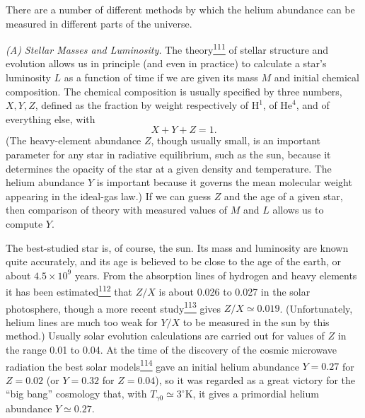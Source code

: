 There are a number of different methods by which the helium abundance can be
measured in different parts of the universe.

\emph{(A) Stellar Masses and Luminosity.} The
theory\hyperref[ch15-ref-111]{\textsuperscript{111}} of stellar structure and
evolution allows us in principle (and even in practice) to calculate a star's
luminosity \(L\) as a function of time if we are given its mass \(M\) and
initial chemical composition. The chemical composition is usually specified
by three numbers, \(X,Y,Z\), defined as the fraction by weight respectively
of \(\mathrm H^1\), of \(\mathrm{He}^4\), and of everything else, with
\[
  X+Y+Z=1.
\]
(The heavy-element abundance \(Z\), though usually small, is an important
parameter for any star in radiative equilibrium, such as the sun, because it
determines the opacity of the star at a given density and temperature. The
helium abundance \(Y\) is important because it governs the mean molecular
weight appearing in the ideal-gas law.) If we can guess \(Z\) and the age of
a given star, then comparison of theory with measured values of \(M\) and
\(L\) allows us to compute \(Y\).

The best-studied star is, of course, the sun. Its mass and luminosity are
known quite accurately, and its age is believed to be close to the age of the
earth, or about \(4.5\times10^9\) years. From the absorption lines of hydrogen
and heavy elements it has been
estimated\hyperref[ch15-ref-112]{\textsuperscript{112}} that \(Z/X\) is
about 0.026 to 0.027 in the solar photosphere, though a more recent
study\hyperref[ch15-ref-113]{\textsuperscript{113}} gives
\(Z/X\simeq0.019\). (Unfortunately, helium lines are much too weak for
\(Y/X\) to be measured in the sun by this method.) Usually solar evolution
calculations are carried out for values of \(Z\) in the range 0.01 to 0.04.
At the time of the discovery of the cosmic microwave radiation the best solar
models\hyperref[ch15-ref-114]{\textsuperscript{114}} gave an initial helium
abundance \(Y=0.27\) for \(Z=0.02\) (or \(Y=0.32\) for \(Z=0.04\)), so it
was regarded as a great victory for the ``big bang'' cosmology that, with
\(T_{\gamma0}\simeq3^\circ\mathrm K\), it gives a primordial helium
abundance \(Y\simeq0.27\).

